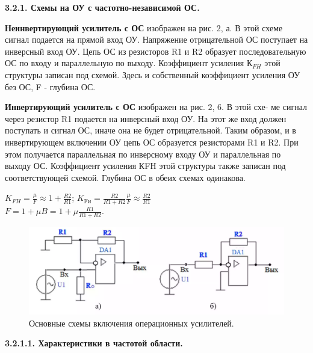 \documentclass[a4paper,14pt]{extarticle}
\begin{document}
    \newpage
    \begin{center}
        \textbf{3.2.1. Схемы на ОУ с частотно-независимой ОС.}
    \end{center}

    \textbf{Неинвертирующий усилитель с ОС} изображен на рис. 2, а. В этой
    схеме сигнал подается на прямой вход ОУ. Напряжение отрицательной ОС поступает на инверсный вход ОУ. Цепь ОС из резисторов R1 и R2 образует
    последовательную ОС по входу и параллельную по выходу. Коэффициент
    усиления $К_{FH}$ этой структуры записан под схемой. Здесь и собственный
    коэффициент усиления ОУ без ОС, F - глубина ОС.

    \textbf{Инвертирующий усилитель с ОС} изображен на рис. 2, 6. В этой схе-
    ме сигнал через резистор R1 подается на инверсный вход ОУ. На этот же
    вход должен поступать и сигнал ОС, иначе она не будет отрицательной.
    Таким образом, и в инвертирующем включении ОУ цепь ОС образуется
    резисторами R1 и R2. При этом получается параллельная по инверсному
    входу ОУ и параллельная по выходу ОС. Коэффициент усиления КFH этой
    структуры также записан под соответствующей схемой. Глубина ОС в обеих
    схемах одинакова.
    \begin{center}
        $K_{FH}=\frac{\mu}{F}\approx 1+\frac{R2}{R1}$; $K_\text{Fи}=\frac{R2}{R1+R2}\frac{\mu}{F}\approx \frac{R2}{R1}$\\
        $F=1+\mu B=1+\mu \frac{R1}{R1+R2}$.   
    \end{center}
    \begin{figure}[h!]
        \begin{center}
            \includegraphics[scale=0.5]{3.png}
        \end{center} 
        \caption{Основные схемы включения операционных усилителей.}
    \end{figure}
    \newpage

    \begin{center}
        \textbf{3.2.1.1. Характеристики в частотой области.}
    \end{center}
\end{document}
